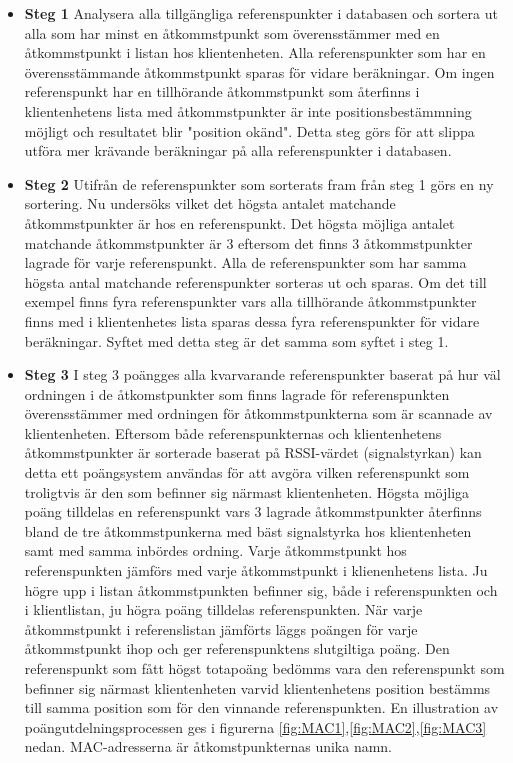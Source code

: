 \documentclass[swedish, a4paper,12pt]{article}
\begin{document}
  \begin{itemize}
    \item \textbf{Steg 1}
    \newline
    Analysera alla tillgängliga referenspunkter i databasen och sortera ut alla som har minst en åtkommstpunkt som överensstämmer med en åtkommstpunkt i listan hos klientenheten. Alla referenspunkter som har en överensstämmande åtkommstpunkt sparas för vidare beräkningar. Om ingen referenspunkt har en tillhörande åtkommstpunkt som återfinns i klientenhetens lista med åtkommstpunkter är inte positionsbestämmning möjligt och resultatet blir "position okänd".
    Detta steg görs för att slippa utföra mer krävande beräkningar på alla referenspunkter i databasen.
    \item \textbf{Steg 2}
    \newline
    Utifrån de referenspunkter som sorterats fram från steg 1 görs en ny sortering. Nu undersöks vilket det högsta antalet matchande åtkommstpunkter är hos en referenspunkt. Det högsta möjliga antalet matchande åtkommstpunkter är 3 eftersom det finns 3 åtkommstpunkter lagrade för varje referenspunkt. Alla de referenspunkter som har samma högsta antal matchande referenspunkter sorteras ut och sparas.
    Om det till exempel finns fyra referenspunkter vars alla tillhörande åtkommstpunkter finns med i klientenhetes lista sparas dessa fyra referenspunkter för vidare beräkningar. Syftet med detta steg är det samma som syftet i steg 1.

    \item \textbf{Steg 3}
    \newline
    I steg 3 poängges alla kvarvarande referenspunkter baserat på hur väl ordningen i de åtkomstpunkter som finns lagrade för referenspunkten överensstämmer med ordningen för åtkommstpunkterna som är scannade av klientenheten. Eftersom både referenspunkternas och klientenhetens åtkommstpunkter är sorterade baserat på RSSI-värdet (signalstyrkan) kan detta ett poängsystem användas för att avgöra vilken referenspunkt som troligtvis är den som befinner sig närmast klientenheten.
    Högsta möjliga poäng tilldelas en referenspunkt vars 3 lagrade åtkommstpunkter återfinns bland de tre åtkommstpunkerna med bäst signalstyrka hos klientenheten samt med samma inbördes ordning. Varje åtkommstpunkt hos referenspunkten jämförs med varje åtkommstpunkt i klienenhetens lista. Ju högre upp i listan åtkommstpunkten befinner sig, både i referenspunkten och i klientlistan, ju högra poäng tilldelas referenspunkten. När varje åtkommstpunkt i referenslistan jämförts läggs poängen för varje åtkommstpunkt ihop och ger referenspunktens slutgiltiga poäng.
    Den referenspunkt som fått högst totapoäng bedömms vara den referenspunkt som befinner sig närmast klientenheten varvid klientenhetens position bestämms till samma position som för den vinnande referenspunkten.
    En illustration av poängutdelningsprocessen ges i figurerna \ref{fig:MAC1},\ref{fig:MAC2},\ref{fig:MAC3} nedan.
    MAC-adresserna är åtkomstpunkternas unika namn.



\end{itemize}
\end{document}

